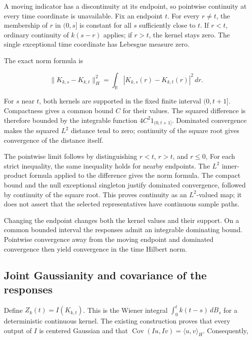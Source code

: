 \documentclass[11pt,a4paper]{report}
\begin{document}
A moving indicator has a discontinuity at its endpoint, so pointwise continuity at every time coordinate is unavailable. Fix an endpoint \(t\). For every \(r\ne t\), the membership of \(r\) in \((0,s]\) is constant for all \(s\) sufficiently close to \(t\). If \(r<t\), ordinary continuity of \(k(s-r)\) applies; if \(r>t\), the kernel stays zero. The single exceptional time coordinate has Lebesgue measure zero.



The exact norm formula is

\[\|K_{k,s}-K_{k,t}\|_H^2=\int_{\mathbb R}|K_{k,s}(r)-K_{k,t}(r)|^2\,dr.\]

For \(s\) near \(t\), both kernels are supported in the fixed finite interval \((0,t+1]\). Compactness gives a common bound \(C\) for their values. The squared difference is therefore bounded by the integrable function \(4C^2 1_{(0,t+1]}\). Dominated convergence makes the squared \(L^{2}\) distance tend to zero; continuity of the square root gives convergence of the distance itself.



The pointwise limit follows by distinguishing \(r<t\), \(r>t\), and \(r\le0\), For each strict inequality, the same inequality holds for nearby endpoints. The \(L^{2}\) inner-product formula applied to the difference gives the norm formula. The compact bound and the null exceptional singleton justify dominated convergence, followed by continuity of the square root. This proves continuity as an \(L^{2}\)-valued map; it does not assert that the selected representatives have continuous sample paths.



Changing the endpoint changes both the kernel values and their support. On a common bounded interval the responses admit an integrable dominating bound. Pointwise convergence away from the moving endpoint and dominated convergence then yield convergence in the time Hilbert norm.

\subsection{\texorpdfstring{Joint Gaussianity and covariance of the responses}{Joint Gaussianity and covariance of the responses}}
\label{report-step-KineticLangevin-BrownianConvolution-lean-5}


Define \(Z_k(t)=I(K_{k,t})\). This is the Wiener integral \(\int_0^t k(t-s)\,dB_s\) for a deterministic continuous kernel. The existing construction proves that every output of \(I\) is centered Gaussian and that \(\operatorname{Cov}(Iu,Iv)=\langle u,v\rangle_H\). Consequently,
\end{document}
